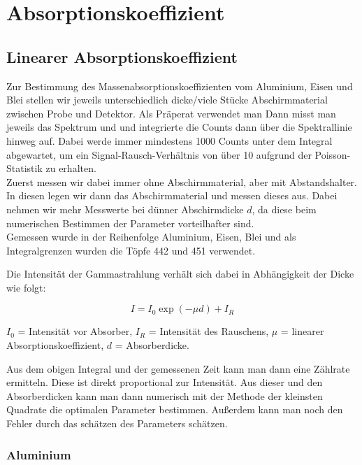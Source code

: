 \clearpage
\section{Absorptionskoeffizient}

\subsection{Linearer Absorptionskoeffizient}

Zur Bestimmung des Massenabsorptionskoeffizienten vom Aluminium, Eisen und Blei stellen wir jeweils 
unterschiedlich dicke/viele Stücke Abschirmmaterial zwischen Probe und Detektor. Als Präperat verwendet man  Dann misst man jeweils das Spektrum und und 
integrierte die Counts dann über die Spektrallinie hinweg auf. Dabei werde immer mindestens 1000 Counts unter dem Integral abgewartet, 
um ein Signal-Rausch-Verhältnis von über 10 aufgrund der Poisson-Statistik zu erhalten. \\
Zuerst messen wir dabei immer ohne Abschirmmaterial, aber mit Abstandshalter. In diesen legen wir dann das Abschirmmaterial und messen dieses aus. 
Dabei nehmen wir mehr Messwerte bei dünner Abschirmdicke $d$, da diese beim numerischen Bestimmen der Parameter vorteilhafter sind. \\
Gemessen wurde in der Reihenfolge Aluminium, Eisen, Blei und als Integralgrenzen wurden die Töpfe 442 und 451 verwendet.

Die Intensität der Gammastrahlung verhält sich dabei in Abhängigkeit der Dicke wie folgt:

\begin{equation}
    I = I_0 \exp(- \mu d) +I_R
    \label{Intensitaet}
\end{equation}

$I_0$ = Intensität vor Absorber, $I_R$ = Intensität des Rauschens, $\mu$ = linearer Absorptionskoeffizient, $d$ = Absorberdicke. 

Aus dem obigen Integral und der gemessenen Zeit kann man dann eine Zählrate ermitteln. Diese ist direkt proportional zur Intensität. 
Aus dieser und den Absorberdicken kann man dann numerisch mit der Methode der kleinsten Quadrate die optimalen Parameter bestimmen. Außerdem kann man 
noch den Fehler durch das schätzen des Parameters schätzen.\\

\subsubsection*{Aluminium}

